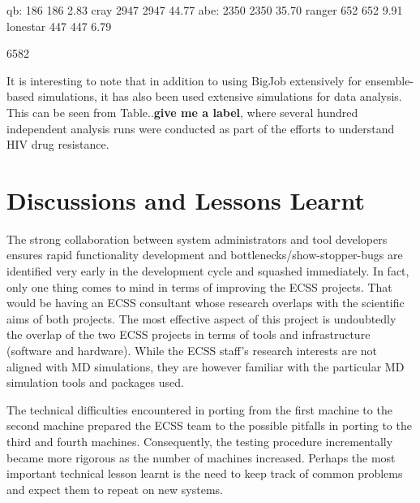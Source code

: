 \documentclass{sig-alternate}
\begin{document}
qb: 186	186	2.83%
cray 2947	2947	44.77%
abe: 2350	2350	35.70%
ranger 652	652	9.91%
lonestar 447	447	6.79%

6582	




It is interesting to note that in addition to using BigJob extensively
for ensemble-based simulations, it has also been used extensive
simulations for data analysis. This can be seen from Table..{\bf give
  me a label}, where several hundred independent analysis runs were
conducted as part of the efforts to understand HIV drug resistance.


\section{Discussions and Lessons Learnt}




The strong collaboration between system administrators and tool
developers ensures rapid functionality development and
bottlenecks/show-stopper-bugs are identified very early in the
development cycle and squashed immediately. In fact, only one thing
comes to mind in terms of improving the ECSS projects. That would be
having an ECSS consultant whose research overlaps with the scientific
aims of both projects. The most effective aspect of this project is undoubtedly
the overlap of the two ECSS projects in terms of tools and infrastructure
(software and hardware). While the ECSS staff's research interests are not
aligned with MD simulations, they are however familiar with the particular MD
simulation tools and packages used.

The technical difficulties encountered in porting from the first
machine to the second machine prepared the ECSS team to the possible
pitfalls in porting to the third and fourth machines. Consequently,
the testing procedure incrementally became more rigorous as the number
of machines increased. Perhaps the most important technical lesson
learnt is the need to keep track of common problems and expect them to
repeat on new systems.
\end{document}
